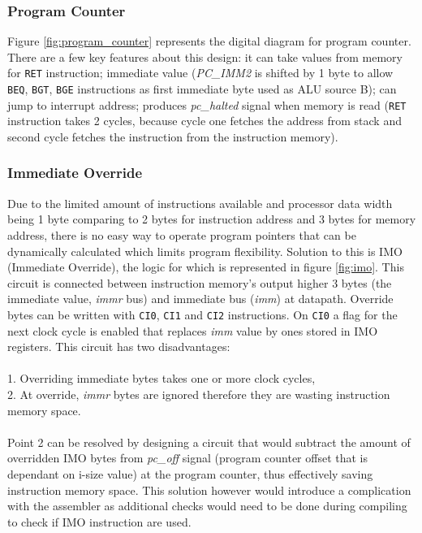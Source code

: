 \documentclass[a4paper,12pt]{article}
\begin{document}
\begin{multicols}{2}

\subsubsection{Program Counter} \label{sec:pc}
Figure \ref{fig:program_counter} represents the digital diagram for program counter. There are a few key features about this design: it can take values from memory for \texttt{RET} instruction; immediate value (\textit{PC\_IMM2} is shifted by 1 byte to allow \texttt{BEQ}, \texttt{BGT}, \texttt{BGE} instructions as first immediate byte used as ALU source B); can jump to interrupt address; produces \textit{pc\_halted} signal when memory is read (\texttt{RET} instruction takes 2 cycles, because cycle one fetches the address from stack and second cycle fetches the instruction from the instruction memory).


\subsubsection{Immediate Override} \label{sec:imo}
Due to the limited amount of instructions available and processor data width being 1 byte comparing to 2 bytes for instruction address and 3 bytes for memory address, there is no easy way to operate program pointers that can be dynamically calculated which limits program flexibility. Solution to this is IMO (Immediate Override), the logic for which is represented in figure \ref{fig:imo}. This circuit is connected between instruction memory's output higher 3 bytes (the immediate value, \textit{immr} bus) and immediate bus (\textit{imm}) at datapath. Override bytes can be written with \texttt{CI0}, \texttt{CI1} and \texttt{CI2} instructions. On \texttt{CI0} a flag for the next clock cycle is enabled that replaces \textit{imm} value by ones stored in IMO registers. This circuit has two disadvantages: \\
\\
1. Overriding immediate bytes takes one or more clock cycles,\\
2. At override, \textit{immr} bytes are ignored therefore they are wasting instruction memory space.\\
\\
Point 2 can be resolved by designing a circuit that would subtract the amount of overridden IMO bytes from \textit{pc\_off} signal (program counter offset that is dependant on i-size value) at the program counter, thus effectively saving instruction memory space. This solution however would introduce a complication with the assembler as additional checks would need to be done during compiling to check if IMO instruction are used.
\end{multicols}
\end{document}

